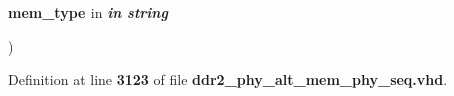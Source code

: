 {\begin{DoxyParamCaption}
\item[{}]{{\bfseries \textcolor{vhdlchar}{mem\+\_\+type}\textcolor{vhdlchar}{ }}\textcolor{stringliteral}{in} {\em {\bfseries \textcolor{keywordflow}{in}\textcolor{vhdlchar}{ }\textcolor{comment}{string}\textcolor{vhdlchar}{ }\textcolor{vhdlchar}{ }\textcolor{vhdlchar}{ }}}}
\end{DoxyParamCaption}
)\hspace{0.3cm}{\ttfamily [Function]}}\label{class__ddr2__phy__alt__mem__phy__addr__cmd__pkg_a270db924f605139e684538afb8a6f4b9}


Definition at line {\bf 3123} of file {\bf ddr2\+\_\+phy\+\_\+alt\+\_\+mem\+\_\+phy\+\_\+seq.\+vhd}.

